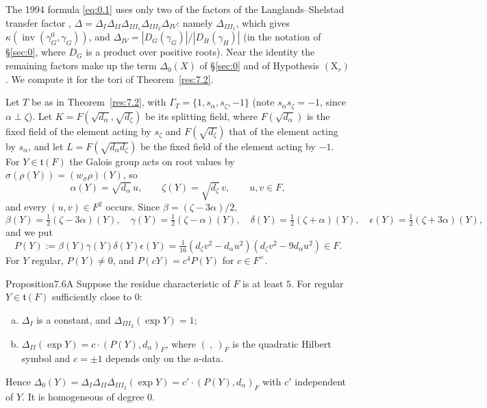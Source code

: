 \documentclass[12pt,letterpaper]{amsart}
\theoremstyle{plain}
\theoremstyle{definition}
\theoremstyle{remark}
\theoremstyle{definition}
\DeclareMathOperator{\inv}{inv}
\begin{document}
The 1994 formula \eqref{eq:0.1} uses only two of the factors of the
Langlands--Shelstad transfer factor \cite[\S\S2--3]{LS87},
$\Delta=\Delta_I\Delta_{II}\Delta_{III_1}\Delta_{III_2}\Delta_{IV}$: namely
$\Delta_{III_1}$, which gives $\kappa(\inv(\gamma^0_G,\gamma_G))$, and
$\Delta_{IV}=|D_G(\gamma_G)|/|D_H(\gamma_H)|$ (in the notation of \S\ref{sec:0},
where $D_G$ is a product over positive roots). Near the identity the remaining
factors make up the term $\Delta_0(X)$ of \S\ref{sec:0} and of
Hypothesis $(\mathrm X_r)$. We compute it for the tori of
Theorem~\ref{res:7.2}.

Let $T$ be as in Theorem~\ref{res:7.2}, with
$\Gamma_T=\{1,s_\alpha,s_\zeta,-1\}$ (note $s_\alpha s_\zeta=-1$, since
$\alpha\perp\zeta$). Let $K=F(\sqrt{d_\alpha},\sqrt{d_\zeta})$ be its splitting
field, where $F(\sqrt{d_\alpha})$ is the fixed field of the element acting by
$s_\zeta$ and $F(\sqrt{d_\zeta})$ that of the element acting by $s_\alpha$, and
let $L=F(\sqrt{d_\alpha d_\zeta})$ be the fixed field of the element acting by
$-1$. For $Y\in\mathfrak t(F)$ the Galois group acts on root values by
$\sigma(\rho(Y))=(w_\sigma\rho)(Y)$, so
\[
\alpha(Y)=\sqrt{d_\alpha}\,u,\qquad \zeta(Y)=\sqrt{d_\zeta}\,v,\qquad u,v\in F,
\]
and every $(u,v)\in F^2$ occurs. Since $\beta=(\zeta-3\alpha)/2$,
\[
\beta(Y)=\tfrac12(\zeta-3\alpha)(Y),\quad
\gamma(Y)=\tfrac12(\zeta-\alpha)(Y),\quad
\delta(Y)=\tfrac12(\zeta+\alpha)(Y),\quad
\epsilon(Y)=\tfrac12(\zeta+3\alpha)(Y),
\]
and we put
\begin{equation}\tag{7.6}\label{eq:7.6}
P(Y):=\beta(Y)\gamma(Y)\delta(Y)\epsilon(Y)
=\tfrac1{16}(d_\zeta v^2-d_\alpha u^2)(d_\zeta v^2-9d_\alpha u^2)\in F.
\end{equation}
For $Y$ regular, $P(Y)\neq0$, and $P(cY)=c^4P(Y)$ for $c\in F^\times$.

\begin{res}{Proposition}{7.6A}\label{res:7.6A}
Suppose the residue characteristic of $F$ is at least $5$. For regular $Y\in\mathfrak t(F)$ sufficiently close to $0$:
\begin{enumerate}[(a)]
\item $\Delta_I$ is a constant, and $\Delta_{III_2}(\exp Y)=1$;
\item $\Delta_{II}(\exp Y)=c\cdot(P(Y),d_\alpha)_F$, where $(\ ,\ )_F$ is the
quadratic Hilbert symbol and $c=\pm1$ depends only on the $a$-data.
\end{enumerate}
Hence $\Delta_0(Y)=\Delta_I\Delta_{II}\Delta_{III_2}(\exp Y)=c'\cdot(P(Y),d_\alpha)_F$
with $c'$ independent of $Y$. It is homogeneous of degree $0$.
\end{res}
\end{document}
